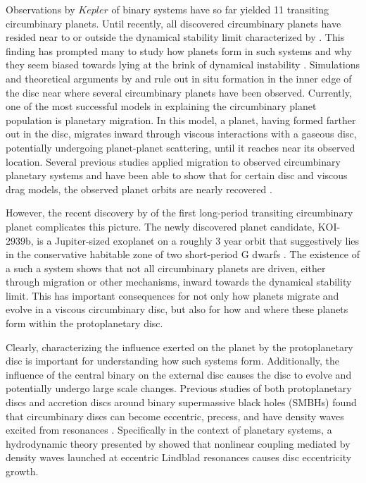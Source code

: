 Observations by $Kepler$ of binary systems have so far yielded 11 transiting circumbinary planets.  Until recently, all discovered circumbinary planets have resided near to or outside the dynamical stability limit characterized by \citet{Dvorak1986,Holman1999}.  This
finding has prompted many to study how planets form in such systems and why they seem biased towards lying at the brink of dynamical instability \citep{Welsh14,PierensNelson13}.  Simulations and theoretical arguments by \citet{Pelupessy13} and \citet{Bromley2015} rule out in situ formation
in the inner edge of the disc near where several circumbinary planets have been observed.  Currently, one of the most successful models in explaining the circumbinary planet population is planetary migration.  
In this model, a planet, having formed farther out in the disc, migrates inward through viscous interactions with a gaseous disc, potentially undergoing planet-planet scattering, until it reaches near its observed location.  Several previous studies applied migration to observed circumbinary planetary systems and have been able to show that for certain disc and viscous drag models, the observed planet orbits are nearly recovered \citep[e.g.][]{Kley2014,Kley2015,PierensNelson07,PierensNelson13}.

However, the recent discovery by \citet{Kostov2016} of the first long-period transiting circumbinary planet complicates this picture.  The newly discovered planet candidate, KOI-2939b, is a Jupiter-sized exoplanet on a roughly 3 year orbit that suggestively lies in the conservative habitable zone of two short-period G dwarfs \citep{Kostov2016}.  The existence of a such a system shows that not all circumbinary planets are driven, either through migration or other mechanisms, inward towards the dynamical stability limit.  This has important consequences for not only how planets migrate and evolve in a viscous circumbinary disc, but also for how and where these planets form within the protoplanetary disc.

Clearly, characterizing the influence exerted on the planet by the protoplanetary disc is important for understanding how such systems form.  Additionally, the influence of the central binary on the external disc causes the disc to evolve and potentially undergo large scale changes.  Previous studies of both protoplanetary discs and accretion discs around binary supermassive black holes (SMBHs) found that circumbinary discs can become eccentric, precess, and have density waves excited from resonances \citep{Dunhill2015,MacFadyen08,Papaloizou01,PierensNelson07,PierensNelson13,Roedig12}.  Specifically in the context of planetary systems, a hydrodynamic theory presented by \citet{Lubow91} showed that nonlinear coupling mediated by density waves launched at eccentric Lindblad resonances causes disc eccentricity growth. 


